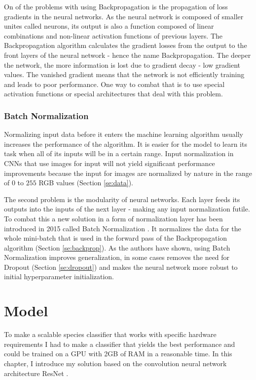 \documentclass[times, utf8, diplomski]{fer}
\begin{document}
On of the problems with using Backpropagation is the propagation of loss gradients in the neural networks. As the neural network is composed of smaller unites called neurons, its output is also a function composed of linear combinations and non-linear activation functions of previous layers. The Backpropagation algorithm calculates the gradient losses from the output to the front layers of the neural network - hence the name Backpropagation. The deeper the network, the more information is lost due to gradient decay - low gradient values. The vanished gradient means that the network is not efficiently training and leads to poor performance. One way to combat that is to use special activation functions \citep{clevert_fast_2015, xu_empirical_2015, he_delving_2015} or special architectures \citep{he_deep_2016} that deal with this problem. 


\subsection{Batch Normalization}
\label{se:batch_norm}

Normalizing input data before it enters the machine learning algorithm usually increases the performance of the algorithm. It is easier for the model to learn its task when all of its inputs will be in a certain range. Input normalization in CNNs that use images for input will not yield significant performance improvements because the input for images are normalized by nature in the range of $0$ to $255$ RGB values (Section \ref{se:data}). 

The second problem is the modularity of neural networks. Each layer feeds its outputs into the inputs of the next layer - making any input normalization futile. To combat this a new solution in a form of normalization layer has been introduced in 2015 called Batch Normalization \citep{ioffe_batch_2015}. It normalizes the data for the whole mini-batch that is used in the forward pass of the Backpropagation algorithm (Section \ref{se:backprop}). As the authors have shown, using Batch Normalization improves generalization, in some cases removes the need for Dropout (Section \ref{se:dropout}) and makes the neural network more robust to initial hyperparameter initialization.

\chapter{Model}
\label{se:model}
To make a scalable species classifier that works with specific hardware requirements I had to make a classifier that yields the best performance and could be trained on a GPU with 2GB of RAM in a reasonable time. In this chapter, I introduce my solution based on the convolution neural network architecture ResNet \citep{he_deep_2016}.
\end{document}
